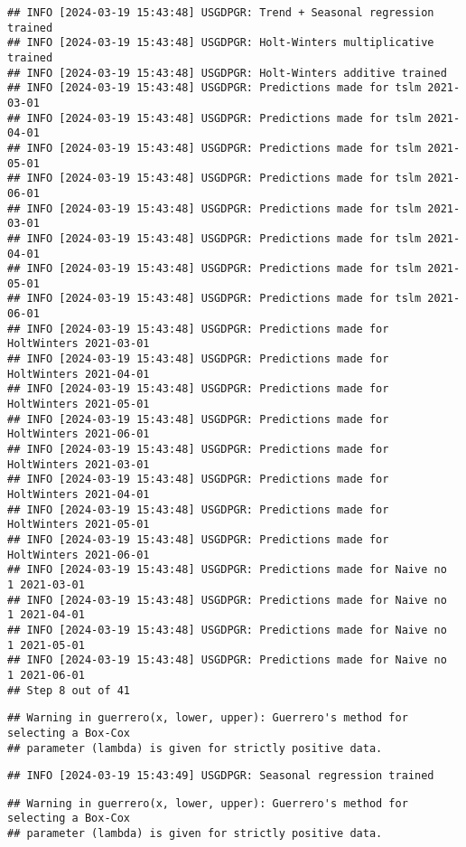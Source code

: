 \documentclass[
]{article}
\begin{document}
\begin{verbatim}
## INFO [2024-03-19 15:43:48] USGDPGR: Trend + Seasonal regression trained
## INFO [2024-03-19 15:43:48] USGDPGR: Holt-Winters multiplicative trained
## INFO [2024-03-19 15:43:48] USGDPGR: Holt-Winters additive trained
## INFO [2024-03-19 15:43:48] USGDPGR: Predictions made for tslm 2021-03-01
## INFO [2024-03-19 15:43:48] USGDPGR: Predictions made for tslm 2021-04-01
## INFO [2024-03-19 15:43:48] USGDPGR: Predictions made for tslm 2021-05-01
## INFO [2024-03-19 15:43:48] USGDPGR: Predictions made for tslm 2021-06-01
## INFO [2024-03-19 15:43:48] USGDPGR: Predictions made for tslm 2021-03-01
## INFO [2024-03-19 15:43:48] USGDPGR: Predictions made for tslm 2021-04-01
## INFO [2024-03-19 15:43:48] USGDPGR: Predictions made for tslm 2021-05-01
## INFO [2024-03-19 15:43:48] USGDPGR: Predictions made for tslm 2021-06-01
## INFO [2024-03-19 15:43:48] USGDPGR: Predictions made for HoltWinters 2021-03-01
## INFO [2024-03-19 15:43:48] USGDPGR: Predictions made for HoltWinters 2021-04-01
## INFO [2024-03-19 15:43:48] USGDPGR: Predictions made for HoltWinters 2021-05-01
## INFO [2024-03-19 15:43:48] USGDPGR: Predictions made for HoltWinters 2021-06-01
## INFO [2024-03-19 15:43:48] USGDPGR: Predictions made for HoltWinters 2021-03-01
## INFO [2024-03-19 15:43:48] USGDPGR: Predictions made for HoltWinters 2021-04-01
## INFO [2024-03-19 15:43:48] USGDPGR: Predictions made for HoltWinters 2021-05-01
## INFO [2024-03-19 15:43:48] USGDPGR: Predictions made for HoltWinters 2021-06-01
## INFO [2024-03-19 15:43:48] USGDPGR: Predictions made for Naive no  1 2021-03-01
## INFO [2024-03-19 15:43:48] USGDPGR: Predictions made for Naive no  1 2021-04-01
## INFO [2024-03-19 15:43:48] USGDPGR: Predictions made for Naive no  1 2021-05-01
## INFO [2024-03-19 15:43:48] USGDPGR: Predictions made for Naive no  1 2021-06-01
## Step 8 out of 41
\end{verbatim}

\begin{verbatim}
## Warning in guerrero(x, lower, upper): Guerrero's method for selecting a Box-Cox
## parameter (lambda) is given for strictly positive data.
\end{verbatim}

\begin{verbatim}
## INFO [2024-03-19 15:43:49] USGDPGR: Seasonal regression trained
\end{verbatim}

\begin{verbatim}
## Warning in guerrero(x, lower, upper): Guerrero's method for selecting a Box-Cox
## parameter (lambda) is given for strictly positive data.
\end{verbatim}
\end{document}
